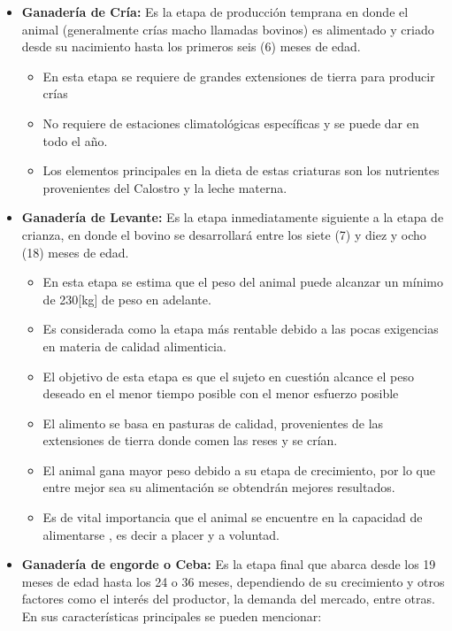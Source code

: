 \begin{itemize}
	\item \textbf{Ganadería de Cría:} Es la etapa de producción temprana en donde el animal (generalmente crías macho llamadas bovinos) es alimentado y criado desde su nacimiento hasta los primeros seis (6) meses de edad. 
	\begin{itemize}
		\item En esta etapa se requiere de grandes extensiones de tierra para producir crías
		\item No requiere de estaciones climatológicas específicas y se puede dar en todo el año.
		\item Los elementos principales en la dieta de estas criaturas son los nutrientes provenientes del Calostro y la leche materna.\\
	\end{itemize} 
	\item \textbf{Ganadería de Levante:} Es la etapa inmediatamente siguiente a la etapa de crianza, en donde el bovino se desarrollará entre los siete (7) y diez y ocho (18) meses de edad.
	\begin{itemize}
		\item En esta etapa se estima que el peso del animal puede alcanzar un mínimo de 230[kg] de peso en adelante.
		\item Es considerada como la etapa más rentable debido a las  pocas exigencias en materia de calidad alimenticia. 
		\item El objetivo de esta etapa es que el sujeto en cuestión alcance el peso deseado en el menor tiempo posible con el menor esfuerzo posible
		\item El alimento se basa en pasturas de calidad, provenientes de las extensiones de tierra donde comen las reses y se crían.
		\item El animal gana mayor peso debido a su etapa de crecimiento, por lo que entre mejor sea su alimentación se obtendrán mejores resultados.
		\item Es de vital importancia que el animal se encuentre en la capacidad de  alimentarse , es decir a placer y a voluntad.\\
	\end{itemize} 
	\item \textbf{Ganadería de engorde o Ceba:} Es la etapa final que abarca desde los 19 meses de edad hasta los 24 o 36 meses, dependiendo de su crecimiento  y otros factores como el interés del productor, la demanda del mercado, entre otras. En sus características principales se pueden mencionar:

\end{itemize}
